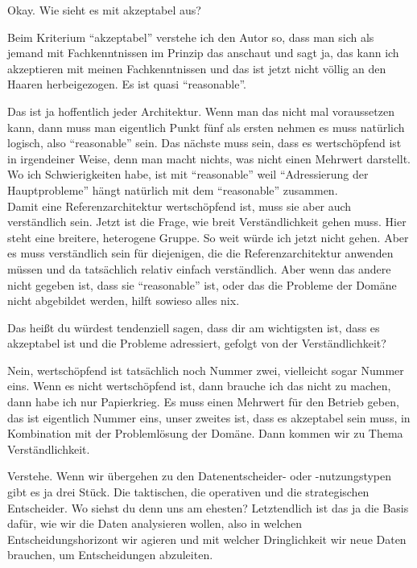 \PA	 Okay. Wie sieht es mit akzeptabel aus?

\LF	Beim Kriterium \enquote{akzeptabel} verstehe ich den Autor so, dass man sich als jemand mit Fachkenntnissen im Prinzip das anschaut und sagt ja, das kann ich akzeptieren mit meinen Fachkenntnissen und das ist jetzt nicht völlig an den Haaren herbeigezogen. Es ist quasi \enquote{reasonable}.

\PA	Das ist ja hoffentlich jeder Architektur. Wenn man das nicht mal voraussetzen kann, dann muss man eigentlich Punkt fünf als ersten nehmen es muss natürlich logisch, also \enquote{reasonable} sein. Das nächste muss sein, dass es wertschöpfend ist in irgendeiner Weise, denn man macht nichts, was nicht einen Mehrwert darstellt. Wo ich Schwierigkeiten habe, ist mit \enquote{reasonable}  weil \enquote{Adressierung der Hauptprobleme} hängt natürlich mit dem \enquote{reasonable} zusammen.\\
Damit eine Referenzarchitektur wertschöpfend ist, muss sie aber auch verständlich sein. Jetzt ist die Frage, wie breit Verständlichkeit gehen muss. Hier steht eine breitere, heterogene Gruppe. So weit würde ich jetzt nicht gehen. Aber es muss verständlich sein für diejenigen, die die Referenzarchitektur anwenden müssen und da tatsächlich relativ einfach verständlich. Aber wenn das andere nicht gegeben ist, dass sie \enquote{reasonable} ist, oder das die Probleme der Domäne nicht abgebildet werden, hilft sowieso alles nix.

\LF	 Das heißt du würdest tendenziell sagen, dass dir am wichtigsten ist, dass es akzeptabel ist und die Probleme adressiert, gefolgt von der Verständlichkeit?

\PA	 Nein, wertschöpfend ist tatsächlich noch Nummer zwei, vielleicht sogar Nummer eins. Wenn es nicht wertschöpfend ist, dann brauche ich das nicht zu machen, dann habe ich nur Papierkrieg. Es muss einen Mehrwert für den Betrieb geben, das ist eigentlich Nummer eins, unser zweites ist, dass es akzeptabel sein muss, in Kombination mit der Problemlösung der Domäne. Dann kommen wir zu Thema Verständlichkeit.

\LF	 Verstehe. Wenn wir übergehen zu den Datenentscheider- oder -nutzungstypen gibt es ja drei Stück.  Die taktischen, die operativen und die strategischen Entscheider. Wo siehst du denn uns am ehesten? Letztendlich ist das ja die Basis dafür, wie wir die Daten analysieren wollen, also in welchen Entscheidungshorizont wir agieren und mit welcher Dringlichkeit wir neue Daten brauchen, um Entscheidungen abzuleiten.

